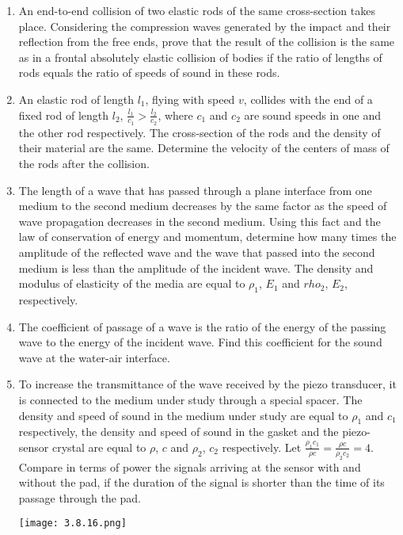 \documentclass{article}
\begin{document}
\begin{enumerate}[label=3.8.\arabic*]
\item An end-to-end collision of two elastic rods of the same cross-section takes place. Considering the compression waves generated by the impact and their reflection from the free ends, prove that the result of the collision is the same as in a frontal absolutely elastic collision of bodies if the ratio of lengths of rods equals the ratio of speeds of sound in these rods.

\item An elastic rod of length $l_1$, flying with speed $v$, collides with the end of a fixed rod of length $l_2$, $\frac{l_1}{c_1} > \frac{l_2}{c_2}$, where $c_1$ and $c_2$ are sound speeds in one and the other rod respectively. The cross-section of the rods and the density of their material are the same. Determine the velocity of the centers of mass of the rods after the collision.

\item The length of a wave that has passed through a plane interface from one medium to the second medium decreases by the same factor as the speed of wave propagation decreases in the second medium. Using this fact and the law of conservation of energy and momentum, determine how many times the amplitude of the reflected wave and the wave that passed into the second medium is less than the amplitude of the incident wave. The density and modulus of elasticity of the media are equal to $\rho_1$, $E_1$ and $rho_2$, $E_2$, respectively.

\item The coefficient of passage of a wave is the ratio of the energy of the passing wave to the energy of the incident wave. Find this coefficient for the sound wave at the water-air interface.

\item To increase the transmittance of the wave received by the piezo transducer, it is connected to the medium under study through a special spacer. The density and speed of sound in the medium under study are equal to $\rho_1$ and $c_1$ respectively, the density and speed of sound in the gasket and the piezo-sensor crystal are equal to $\rho$, $c$ and $\rho_2$, $c_2$ respectively. Let $\frac{\rho_1 c_1}{\rho c} = \frac{\rho c}{\rho_2 c_2} = 4$. Compare in terms of power the signals arriving at the sensor with and without the pad, if the duration of the signal is shorter than the time of its passage through the pad.

\begin{center}
    \texttt{[image: 3.8.16.png]}
\end{center}


\end{enumerate}
\end{document}
